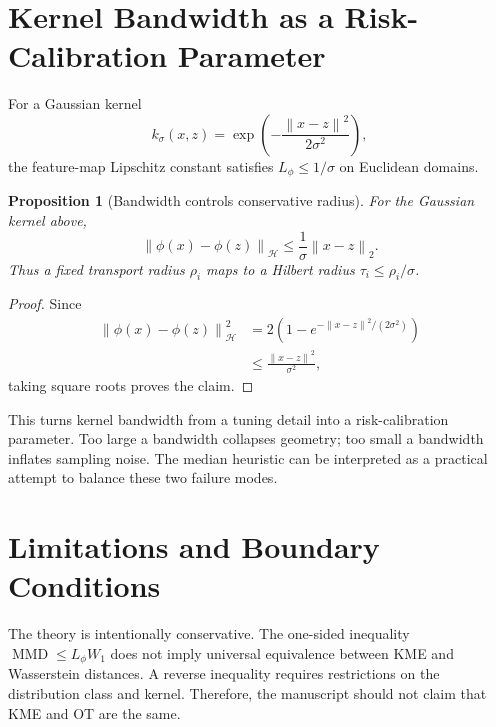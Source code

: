 \documentclass[10pt,journal]{IEEEtran}
\newtheorem{proposition}{Proposition}
\DeclareMathOperator{\MMD}{MMD}
\newcommand{\Hcal}{\mathcal{H}}
\newcommand{\norm}[1]{\left\lVert #1 \right\rVert}
\begin{document}
\section{Kernel Bandwidth as a Risk-Calibration Parameter}
\label{sec:kernel-bandwidth-v5}

For a Gaussian kernel
\begin{equation}
    k_\sigma(x,z)=\exp\!\left(-\frac{\norm{x-z}^2}{2\sigma^2}\right),
\end{equation}
the feature-map Lipschitz constant satisfies $L_\phi\le 1/\sigma$ on Euclidean domains.

\begin{proposition}[Bandwidth controls conservative radius]
\label{prop:bandwidth-v5}
For the Gaussian kernel above,
\begin{equation}
    \norm{\phi(x)-\phi(z)}_{\Hcal}\le \frac{1}{\sigma}\norm{x-z}_2.
\end{equation}
Thus a fixed transport radius $\rho_i$ maps to a Hilbert radius $\tau_i\le \rho_i/\sigma$.
\end{proposition}

\begin{proof}
Since
\begin{equation}
\begin{aligned}
\norm{\phi(x)-\phi(z)}_{\Hcal}^2
&=2\left(1-e^{-\norm{x-z}^2/(2\sigma^2)}\right)\\
&\le \frac{\norm{x-z}^2}{\sigma^2},
\end{aligned}
\end{equation}
taking square roots proves the claim.
\end{proof}

This turns kernel bandwidth from a tuning detail into a risk-calibration parameter. Too large a bandwidth collapses geometry; too small a bandwidth inflates sampling noise. The median heuristic can be interpreted as a practical attempt to balance these two failure modes.

\section{Limitations and Boundary Conditions}
\label{sec:limitations}

The theory is intentionally conservative. The one-sided inequality $\MMD\le L_\phi W_1$ does not imply universal equivalence between KME and Wasserstein distances. A reverse inequality requires restrictions on the distribution class and kernel. Therefore, the manuscript should not claim that KME and OT are the same.
\end{document}
